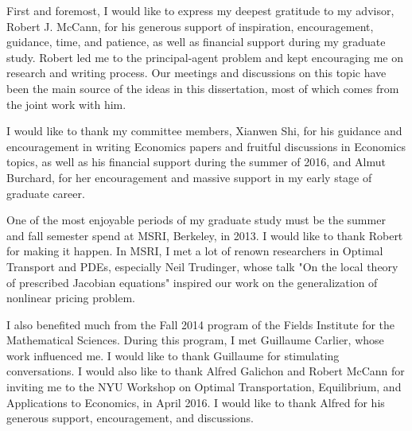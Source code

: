 \documentclass{ut-thesis}[10pt]
\theoremstyle{plain}
\theoremstyle{definition}
\theoremstyle{remark}
\numberwithin{equation}{section}
\begin{document}
\begin{preliminary}
\begin{acknowledgements}

First and foremost, I would like to express my deepest gratitude to my advisor, Robert J. McCann, for his generous support of inspiration, encouragement, guidance,  time, and patience, as well as financial support during my graduate study. Robert led me to the principal-agent problem and kept encouraging me on research and writing process. Our meetings and discussions on this topic have been the main source of the ideas in this dissertation, most of which comes from the joint work with him.

I would like to thank my committee members, Xianwen Shi, for his guidance and encouragement in writing Economics papers and fruitful discussions in Economics topics, as well as his financial support during the summer of 2016, and Almut Burchard, for her encouragement and massive support in my early stage of graduate career.

One of the most enjoyable periods of my graduate study must be the summer and fall semester spend at MSRI, Berkeley, in 2013. I would like to thank Robert for making it happen. In MSRI, I met a lot of renown researchers in Optimal Transport and PDEs, %
especially Neil Trudinger, whose talk "On the local theory of prescribed Jacobian equations" inspired our work on the generalization of nonlinear pricing problem.    

I also benefited much from the Fall 2014 program of the Fields Institute for the Mathematical Sciences. During this program, I met Guillaume Carlier, whose work influenced me. I would like to thank Guillaume for stimulating conversations. I would also like to thank Alfred Galichon and Robert McCann for inviting me to the NYU Workshop on Optimal Transportation, Equilibrium, and Applications to Economics, in April 2016. I would like to thank Alfred for his generous support, encouragement, and discussions.


\end{acknowledgements}
\end{preliminary}
\end{document}
